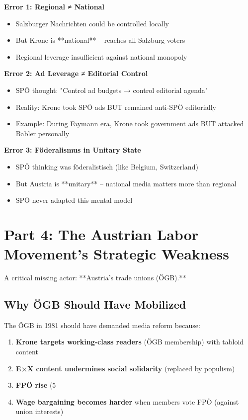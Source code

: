 \textbf{Error 1: Regional ≠ National}
\begin{itemize}
\item Salzburger Nachrichten could be controlled locally
\item But Krone is **national** -- reaches all Salzburg voters
\item Regional leverage insufficient against national monopoly
\end{itemize}

\textbf{Error 2: Ad Leverage ≠ Editorial Control}
\begin{itemize}
\item SPÖ thought: "Control ad budgets → control editorial agenda"
\item Reality: Krone took SPÖ ads BUT remained anti-SPÖ editorially
\item Example: During Faymann era, Krone took government ads BUT attacked Babler personally
\end{itemize}

\textbf{Error 3: Föderalismus in Unitary State}
\begin{itemize}
\item SPÖ thinking was föderalistisch (like Belgium, Switzerland)
\item But Austria is **unitary** -- national media matters more than regional
\item SPÖ never adapted this mental model
\end{itemize}


\section*{Part 4: The Austrian Labor Movement's Strategic Weakness}

A critical missing actor: **Austria's trade unions (ÖGB).**

\subsection*{Why ÖGB Should Have Mobilized}

The ÖGB in 1981 should have demanded media reform because:

\begin{enumerate}
\item \textbf{Krone targets working-class readers} (ÖGB membership) with tabloid content
\item \textbf{E×X content undermines social solidarity} (replaced by populism)
\item \textbf{FPÖ rise} (5%
\item \textbf{Wage bargaining becomes harder} when members vote FPÖ (against union interests)
\end{enumerate}

